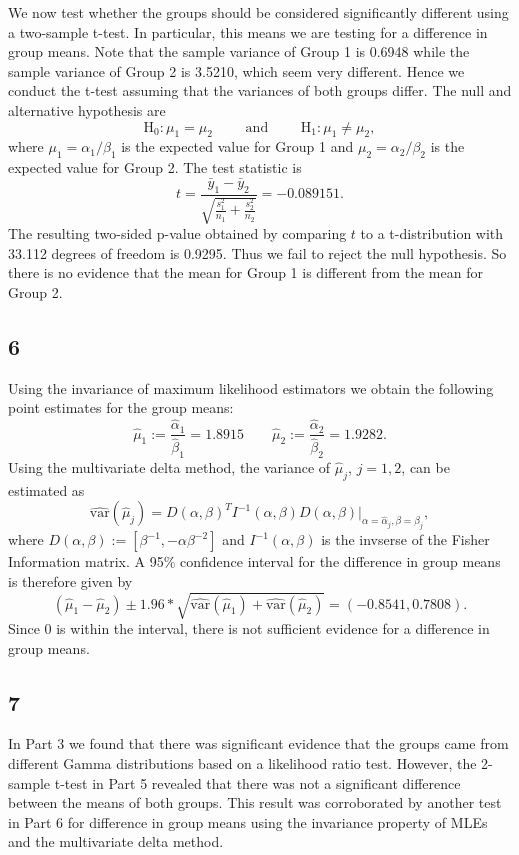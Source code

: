 \documentclass[12pt]{article}
\begin{document}
We now test whether the groups should be considered significantly different using a two-sample t-test. In particular, this means we are testing for a
difference in group means. Note that the sample variance of Group 1 is 0.6948 while the sample variance of Group 2 is 3.5210, which seem very
different. Hence we conduct the t-test assuming that the variances of both groups differ. The null and alternative hypothesis are 
\[
  \text{H}_{0}: \mu_1 = \mu_2 \qquad \text{ and } \qquad \text{H}_1: \mu_1 \neq \mu_2,
\]
where $\mu_1 = \alpha_1 / \beta_1$ is the expected value for Group 1 and $\mu_2 = \alpha_2 / \beta_2$ is the expected value for Group 2.
The test statistic is 
\[
  t = \frac{\bar{y}_1 - \bar{y}_2}{\sqrt{ \frac{s_{1}^{2}}{n_{1}} + \frac{s_{2}^{2}}{n_{2}}}} = -0.089151.
\]
The resulting two-sided p-value obtained by comparing $t$ to a t-distribution with 33.112 degrees of freedom is 0.9295. 
Thus we fail to reject the null hypothesis. So there is no evidence that the mean for Group 1 is
different from the mean for Group 2.


\subsection*{6}

Using the invariance of maximum likelihood estimators we obtain the following point estimates for the group means:
\[
  \hat{\mu}_1 := \frac{\hat{\alpha}_1}{\hat{\beta}_1} = 1.8915 \qquad \hat{\mu}_2 := \frac{\hat{\alpha}_2}{\hat{\beta}_2} = 1.9282. 
\]
Using the multivariate delta method, the variance of $\hat{\mu}_j$, $j = 1,2$, can be estimated as 
\[
  \widehat{\text{var}}(\hat{\mu}_j) = D(\alpha, \beta)^{T} I^{-1}(\alpha,\beta) D(\alpha, \beta) \bigg|_{\alpha = \hat{\alpha}_j, \beta = \hat{\beta}_j},
\]
where $D(\alpha, \beta) := \left[ \beta^{-1}, -\alpha \beta^{-2} \right]$ and $I^{-1}(\alpha, \beta)$ is the invserse of the Fisher Information matrix.
A 95\% confidence interval for the difference in group means is therefore given by 
\[
  (\hat{\mu}_1 - \hat{\mu}_2) \pm 1.96 * \sqrt{ \widehat{\text{var}}(\hat{\mu}_1) + \widehat{\text{var}}(\hat{\mu}_2) } = (-0.8541, 0.7808).
\]
Since 0 is within the interval, there is not sufficient evidence for a difference in group means.


\subsection*{7}

In Part 3 we found that there was significant evidence that the groups came from different Gamma distributions based on a likelihood ratio test.
However, the 2-sample t-test in Part 5 revealed that there was not a significant difference between the means of both groups. This result was corroborated by
another test in Part 6 for difference in group means using the invariance property of MLEs and the multivariate delta method.
\end{document}

